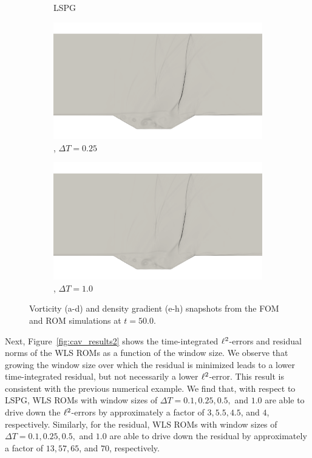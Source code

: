 \begin{figure}
\begin{center}
\begin{subfigure}[t]{0.49\textwidth}
\caption{LSPG}
\end{subfigure}
\begin{subfigure}[t]{0.49\textwidth}
\includegraphics[trim={10cm 3cm 10cm 12cm},clip,width=1.0\linewidth]{figs/cavity_new/dens_wls_numStepsInWindow_5_t50.png}
\caption{\methodAcronym, $\Delta T = 0.25$}
\end{subfigure}
\begin{subfigure}[t]{0.49\textwidth}
\includegraphics[trim={10cm 3cm 10cm 12cm},clip,width=1.0\linewidth]{figs/cavity_new/dens_wls_numStepsInWindow_20_t50.png}
\caption{\methodAcronym, $\Delta T = 1.0$}
\end{subfigure}
\caption{Vorticity (a-d) and density gradient (e-h) snapshots from the FOM and ROM simulations at $t=50.0$.} 
\label{fig:cav_snapshots}
\end{center}
\end{figure}

Next, Figure~\ref{fig:cav_results2} shows the time-integrated $\ell^2$-errors and residual norms of the WLS ROMs as a function of the window size. We observe that growing the window size over 
which the residual is minimized leads to a lower time-integrated residual, but not necessarily a lower $\ell^2$-error. This result is consistent with the previous numerical example. We find that, with respect to LSPG, WLS ROMs with window sizes of $\Delta T = 0.1, 0.25, 0.5,$  and $1.0$ are able to drive down the $\ell^2$-errors by approximately a factor of $3, 5.5, 4.5$, and $4$, respectively. Similarly, for the residual, WLS ROMs with window sizes of $\Delta T = 0.1, 0.25, 0.5,$  and $1.0$ are able to drive down the residual by approximately a factor of $13,57,65$, and $70$, respectively. 

